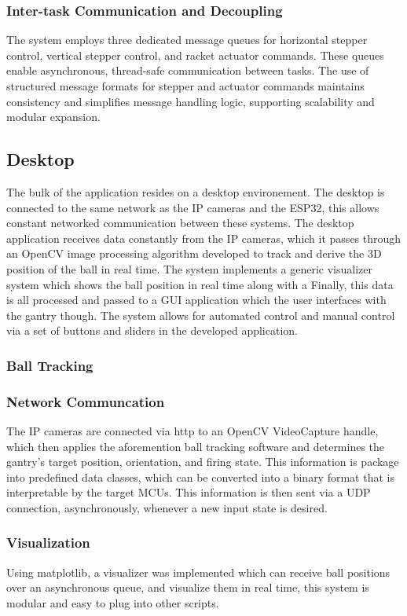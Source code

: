 \subsubsection{Inter-task Communication and Decoupling}
The system employs three dedicated message queues for horizontal stepper control, vertical stepper control, and racket actuator commands. These queues enable asynchronous, thread-safe communication between tasks. The use of structured message formats for stepper and actuator commands maintains consistency and simplifies message handling logic, supporting scalability and modular expansion.

\subsection{Desktop}
The bulk of the application resides on a desktop environement. The desktop is connected to the same network as the IP cameras and the ESP32, this allows constant networked communication between these systems. The desktop application receives data constantly from the IP cameras, which it passes through an OpenCV image processing algorithm developed to track and derive the 3D position of the ball in real time. The system implements a generic visualizer system which shows the ball position in real time along with a Finally, this data is all processed and passed to a GUI application which the user interfaces with the gantry though. The system allows for automated control and manual control via a set of buttons and sliders in the developed application.

\subsubsection{Ball Tracking}

\subsubsection{Network Communcation}
The IP cameras are connected via http to an OpenCV VideoCapture handle, which then applies the aforemention ball tracking software and determines the gantry's target position, orientation, and firing state. This information is package into predefined data classes, which can be converted into a binary format that is interpretable by the target MCUs. This information is then sent via a UDP connection, asynchronously, whenever a new input state is desired.

\subsubsection{Visualization}
Using matplotlib, a visualizer was implemented which can receive ball positions over an asynchronous queue, and visualize them in real time, this system is modular and easy to plug into other scripts.

